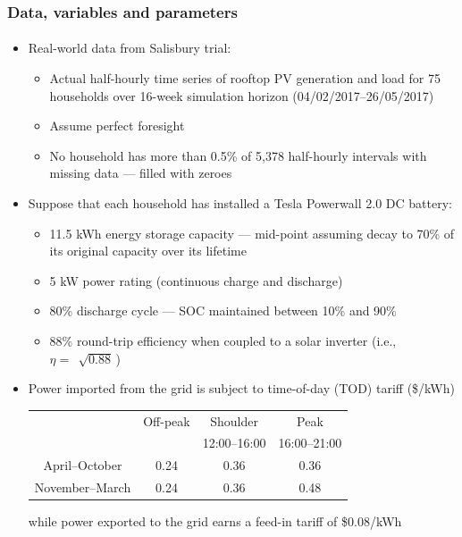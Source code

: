 \documentclass[handout, smaller, xcolor=table]{beamer}			%
\newcommand{\sqrts}[2][]{\,\sqrt[#1]{#2}\,}
\begin{document}
\begin{frame}
	\frametitle{Data, variables and parameters}
	\framesubtitle{}

	\begin{itemize}
		\item  Real-world data from Salisbury trial:
		\begin{itemize}
			\item  Actual half-hourly time series of rooftop PV generation and load for 75 households over 16-week simulation horizon (04/02/2017--26/05/2017)
			\item  Assume perfect foresight
			\item  No household has more than 0.5\% of 5,378 half-hourly intervals with missing data --- filled with zeroes
		\end{itemize}
		
		\item  Suppose that each household has installed a Tesla Powerwall 2.0 DC battery:
		\begin{itemize}
			\item  11.5 kWh energy storage capacity --- mid-point assuming decay to 70\% of its original capacity over its lifetime
			\item  5 kW power rating (continuous charge and discharge)
			\item  80\% discharge cycle --- SOC maintained between 10\% and 90\%
			\item  88\% round-trip efficiency when coupled to a solar inverter (i.e., $\eta = \sqrts{0.88}$)
		\end{itemize}
		\item  Power imported from the grid is subject to time-of-day (TOD) tariff (\$/kWh)
			\begin{table}[!h]
			\centering
			{\scriptsize
			\begin{tabular}{c c c c}
				\toprule
				& Off-peak	& Shoulder	& Peak	\\
				&	& 12:00--16:00	& 16:00--21:00	\\
				\midrule
				April--October	& 0.24	& 0.36	& 0.36	\\
				November--March	& 0.24	& 0.36	& 0.48	\\
				\bottomrule
			\end{tabular}
			}
			\end{table}
		while power exported to the grid earns a feed-in tariff of \$0.08/kWh
	
	\end{itemize}

\end{frame}
\end{document}
